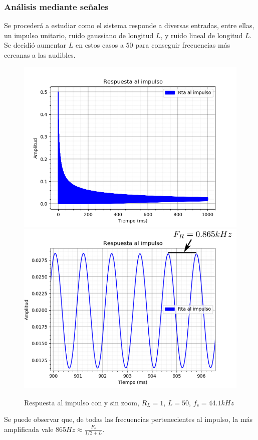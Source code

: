 \documentclass[assd_tp2_main.tex]{subfiles}
\begin{document}
\subsubsection{Análisis mediante señales}
 
Se procederá a estudiar como el sistema responde a diversas entradas, entre ellas, un impulso unitario, ruido gaussiano de longitud $L$, y ruido lineal de longitud $L$. Se decidió aumentar $L$ en estos casos a $50$ para conseguir frecuencias más cercanas a las audibles.
 
\begin{figure}[H]
	\includegraphics[scale=0.55]{graficos/impulsoBloqueS1.png}
	\includegraphics[scale=0.41]{graficos/impulsoBloqueS1Zoom.png}
	\caption{Respuesta al impulso con y sin zoom, $R_L=1$, $L=50$, $f_s=44.1kHz$}
\end{figure}

Se puede observar que, de todas las frecuencias pertenecientes al impulso, la más amplificada vale $865Hz \approx \frac{F_s}{1/2+L}$.
\end{document}
